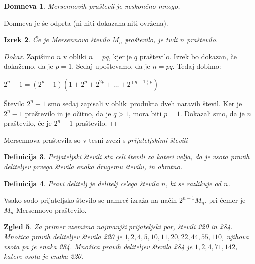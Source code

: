 \documentclass[12pt]{article}
\newtheorem{Izrek}{{\sc Izrek}}[section]
\newtheorem{Definicija}[Izrek]{{\sc Definicija}}
\newtheorem{Domneva}[Izrek]{{\sc Domneva}}
\newtheorem{Zgled}[Izrek]{{\sc Zgled}}
\newenvironment{izrek}{\begin{Izrek}\sl}{\end{Izrek}}
\newenvironment{definicija}{\begin{Definicija}\rm }{\end{Definicija}}
\newenvironment{domneva}{\begin{Domneva}\sl }{\end{Domneva}}
\newenvironment{zgled}{\begin{Zgled}\sl }{\end{Zgled}}
\newenvironment{dokaz}[1][{\sc Dokaz}]{\begin{proof}[#1]\renewcommand*{\qedsymbol}{\(\blacksquare\)}}{\end{proof}}
\begin{document}
\begin{domneva}
 Mersennovih praštevil je neskončno mnogo.
\end{domneva}
Domneva je še odprta (ni niti dokazana niti ovržena).
\begin{izrek}
Če je Mersennovo število $M_n$ praštevilo, je tudi $n$ praštevilo.
\end{izrek}
\begin{dokaz}
Zapišimo $n$ v obliki $n=pq$, kjer je $q$ praštevilo. Izrek bo dokazan, če dokažemo, da je $p=1$. Sedaj upoštevamo, da je $n=pq$. Tedaj dobimo:
\begin{center}
$2^n-1=(2^p-1)(1+2^p+2^{2p}+\ldots+2^{(q-1)p})$
\end{center}
Število $2^n-1$ smo sedaj zapisali v obliki produkta dveh naravih števil. Ker je $2^n-1$ praštevilo in je očitno, da je $q>1$, mora biti $p=1.$
\newline
Dokazali smo, da je $n$ praštevilo, če je $2^n-1$ praštevilo.
\end{dokaz} 
Mersennova praštevila so v tesni zvezi s {\em prijateljskimi števili} 
\begin{definicija}
Prijateljski števili sta celi števili za kateri velja, da je vsota pravih deliteljev prvega števila enaka drugemu številu, in obratno.
\end{definicija}
\begin{definicija}
Pravi delitelj je delitelj celega števila $n$, ki se razlikuje od $n$.
\end{definicija}
Vsako sodo prijateljsko število se namreč izraža na način $2^{n-1}M_n$, pri čemer je $M_n$ Mersennovo praštevilo. 
\begin{zgled}
Za primer vzemimo najmanjši prijateljski par, števili 220 in 284. Množica pravih deliteljev števila 220 je ${1,2,4,5,10,11,20,22,44,55,110}$, njihova vsota pa je enaka 284. Množica pravih deliteljev števila 284 je ${1,2,4,71,142}$, katere vsota je enaka 220.
\end{zgled}
\end{document}

